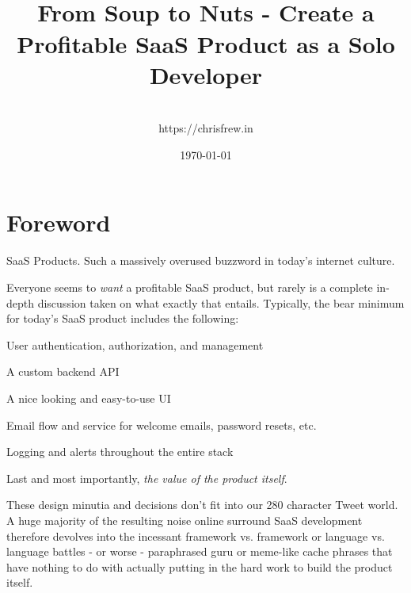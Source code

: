 \documentclass[a4paper,
                             oneside,
                             BCOR1.0cm,
                             DIV11,
                             parskip=full,
                             11pt]{scrbook}
\begin{document}
\title{\\\small{From Soup to Nuts - Create a Profitable SaaS Product as a Solo Developer}}
\author{
    \\https://chrisfrew.in
}
\date{\today}

\maketitle
\tableofcontents

\chapter*{Foreword}\label{cap:primer}


SaaS Products. Such a massively overused buzzword in today's internet culture. 

Everyone seems to \textit{want} a profitable SaaS product, but rarely is a complete in-depth discussion taken on what exactly that entails. Typically, the bear minimum for today's SaaS product includes the following:

\begin{arrows}
\item User authentication, authorization, and management
\item A custom backend API
\item A nice looking and easy-to-use UI
\item Email flow and service for welcome emails, password resets, etc.
\item Logging and alerts throughout the entire stack
\item Last and most importantly, \textit{the value of the product itself}. 
\end{arrows}

These design minutia and decisions don't fit into our 280 character Tweet world. A huge majority of the resulting noise online surround SaaS development therefore devolves into the incessant framework vs. framework or language vs. language battles - or worse - paraphrased guru or meme-like cache phrases that have nothing to do with actually putting in the hard work to build the product itself.
\end{document}
